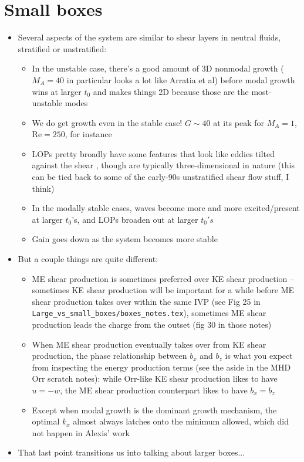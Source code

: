 \documentclass[%
 reprint,
 amsmath,amssymb,
 aps,
]{revtex4-2}
\begin{document}

\section{Small boxes}
    \begin{itemize}
        \item Several aspects of the system are similar to shear layers in neutral fluids, stratified or unstratified:
        \begin{itemize}
            \item In the unstable case, there's a good amount of 3D nonmodal growth ($M_A = 40$ in particular looks a lot like Arratia et al) before modal growth wins at larger $t_0$ and makes things 2D because those are the most-unstable modes
            \item We do get growth even in the stable case! $G \sim 40$ at its peak for $M_A = 1$, $\mathrm{Re} = 250$, for instance
            \item LOPs pretty broadly have some features that look like eddies tilted against the shear , though are typically three-dimensional in nature (this can be tied back to some of the early-90s unstratified shear flow stuff, I think)
            \item In the modally stable cases, waves become more and more excited/present at larger $t_0$'s, and LOPs broaden out at larger $t_0's$
            \item Gain goes down as the system becomes more stable
        \end{itemize}
        \item But a couple things are quite different:
        \begin{itemize}
            \item ME shear production is sometimes preferred over KE shear production -- sometimes KE shear production will be important for a while before ME shear production takes over within the same IVP (see Fig 25 in \texttt{Large\_vs\_small\_boxes/boxes\_notes.tex}), sometimes ME shear production leads the charge from the outset (fig 30 in those notes)
            \item When ME shear production eventually takes over from KE shear production, the phase relationship between $b_x$ and $b_z$ is what you expect from inspecting the energy production terms (see the aside in the MHD Orr scratch notes): while Orr-like KE shear production likes to have $u = -w$, the ME shear production counterpart likes to have $b_x = b_z$ %
            \item Except when modal growth is the dominant growth mechanism, the optimal $k_x$ almost always latches onto the minimum allowed, which did not happen in Alexis' work
        \end{itemize}
        \item That last point transitions us into talking about larger boxes...
    \end{itemize}
\end{document}
